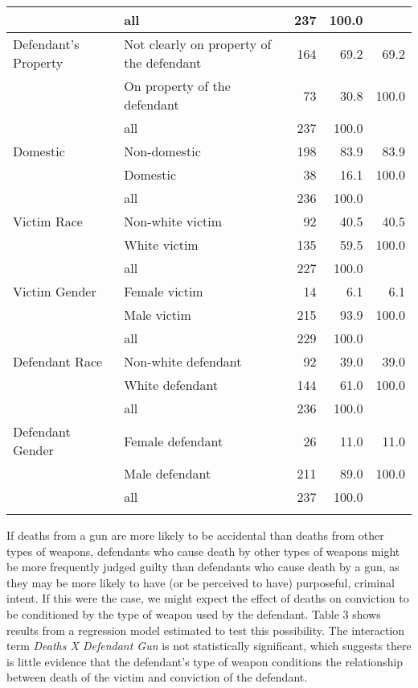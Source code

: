 \documentclass[11pt, oneside]{article}   	%
\begin{document}
{\begin{longtable}{ll|rrr}
   \hline
 & all & 237 & 100.0 &  \\ 
   \hline
\hline
Defendant's Property & Not clearly on property of the defendant & 164 & 69.2 & 69.2 \\ 
   & On property of the defendant & 73 & 30.8 & 100.0 \\ 
   \hline
 & all & 237 & 100.0 &  \\ 
   \hline
\hline
Domestic  & Non-domestic & 198 & 83.9 & 83.9 \\ 
   & Domestic & 38 & 16.1 & 100.0 \\ 
   \hline
 & all & 236 & 100.0 &  \\ 
   \hline
\hline
Victim Race & Non-white victim & 92 & 40.5 & 40.5 \\ 
   & White victim & 135 & 59.5 & 100.0 \\ 
   \hline
 & all & 227 & 100.0 &  \\ 
   \hline
\hline
Victim Gender& Female victim & 14 & 6.1 & 6.1 \\ 
   & Male victim & 215 & 93.9 & 100.0 \\ 
   \hline
 & all & 229 & 100.0 &  \\ 
   \hline
\hline
Defendant Race & Non-white defendant & 92 & 39.0 & 39.0 \\ 
   & White defendant & 144 & 61.0 & 100.0 \\ 
   \hline
 & all & 236 & 100.0 &  \\ 
   \hline
\hline
Defendant Gender & Female defendant & 26 & 11.0 & 11.0 \\ 
   & Male defendant & 211 & 89.0 & 100.0 \\ 
   \hline
 & all & 237 & 100.0 &  \\
    \hline
\label{Summary statistics for categorical variables}
\end{longtable}
}

\pagebreak

\doublespacing

If deaths from a gun are more likely to be accidental than deaths from other types of weapons, defendants who cause death by other types of weapons might be more frequently judged guilty than defendants who cause death by a gun, as they may be more likely to have (or be perceived to have) purposeful, criminal intent. If this were the case, we might expect the effect of deaths on conviction to be conditioned by the type of weapon used by the defendant. Table 3 shows results from a regression model estimated to test this possibility. The interaction term \emph{Deaths X Defendant Gun} is not statistically significant, which suggests there is little evidence that the defendant's type of weapon conditions the relationship between death of the victim and conviction of the defendant.
\end{document}
